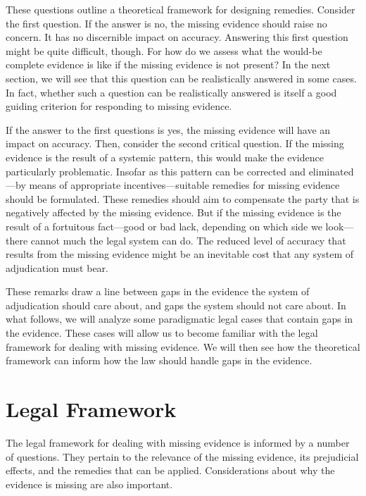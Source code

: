 \documentclass[
  10pt,
  dvipsnames,enabledeprecatedfontcommands]{scrartcl}
\begin{document}
\noindent These questions outline a theoretical framework for designing
remedies. Consider the first question. If the answer is no, the missing
evidence should raise no concern. It has no discernible impact on
accuracy. Answering this first question might be quite difficult,
though. For how do we assess what the would-be complete evidence is like
if the missing evidence is not present? In the next section, we will see
that this question can be realistically answered in some cases. In fact,
whether such a question can be realistically answered is itself a good
guiding criterion for responding to missing evidence.

If the answer to the first questions is yes, the missing evidence will
have an impact on accuracy. Then, consider the second critical question.
If the missing evidence is the result of a systemic pattern, this would
make the evidence particularly problematic. Insofar as this pattern can
be corrected and eliminated---by means of appropriate
incentives---suitable remedies for missing evidence should be
formulated. These remedies should aim to compensate the party that is
negatively affected by the missing evidence. But if the missing evidence
is the result of a fortuitous fact---good or bad lack, depending on
which side we look---there cannot much the legal system can do. The
reduced level of accuracy that results from the missing evidence might
be an inevitable cost that any system of adjudication must bear.

These remarks draw a line between gaps in the evidence the system of
adjudication should care about, and gaps the system should not care
about. In what follows, we will analyze some paradigmatic legal cases
that contain gaps in the evidence. These cases will allow us to become
familiar with the legal framework for dealing with missing evidence. We
will then see how the theoretical framework can inform how the law
should handle gaps in the evidence.

\hypertarget{legal-framework}{%
\section{Legal Framework}\label{legal-framework}}

The legal framework for dealing with missing evidence is informed by a
number of questions. They pertain to the relevance of the missing
evidence, its prejudicial effects, and the remedies that can be applied.
Considerations about why the evidence is missing are also important.
\end{document}
